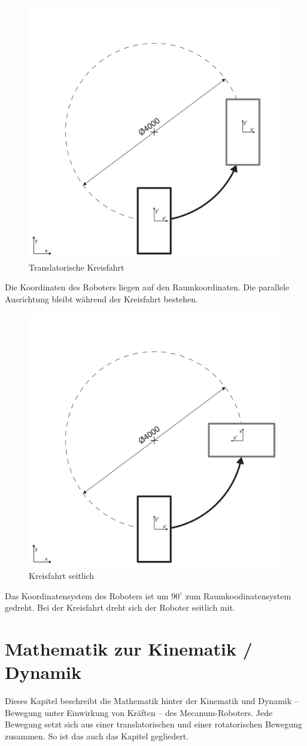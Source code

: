 \documentclass[a4paper]{article}
\begin{document}
\begin{figure}[H]
    \centering
    \includegraphics[width=.6\textwidth]{Viertelkreis-translatorisch}
    \caption{Translatorische Kreisfahrt}
\end{figure}
Die Koordinaten des Roboters liegen auf den Raumkoordinaten. Die parallele Ausrichtung bleibt während der Kreisfahrt bestehen.

\vspace{2cm}
\begin{figure}[H]
    \centering
    \includegraphics[width=.6\textwidth]{Viertelkreis-seitwaerts}
    \caption{Kreisfahrt seitlich}
\end{figure}
Das Koordinatensystem des Roboters ist um $90^\circ$ zum Raumkoodinatensystem gedreht. Bei der Kreisfahrt dreht sich der Roboter seitlich mit.



\section{Mathematik zur Kinematik / Dynamik}
Dieses Kapitel beschreibt die Mathematik hinter der Kinematik und Dynamik -- Bewegung unter Einwirkung von Kräften -- des Mecanum-Roboters. Jede Bewegung setzt sich aus einer translatorischen und einer rotatorischen Bewegung zusammen. So ist das auch das Kapitel gegliedert.
\end{document}
